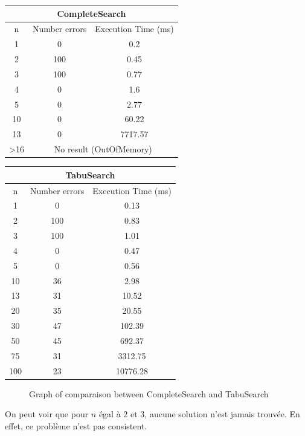 \documentclass[a4paper,10pt]{article}
\begin{document}
\noindent
\begin{tabular}{|c|c|c|}
\hline
\multicolumn{3}{|c|}{CompleteSearch}\\
\hline
n & Number errors & Execution Time (ms) \\
\hline
1 & 0 & 0.2\\
\hline
2 & 100 & 0.45\\
\hline
3 & 100 & 0.77\\
\hline
4 & 0 & 1.6\\
\hline
5 & 0 & 2.77\\
\hline
10 & 0 & 60.22\\
\hline
13 & 0 & 7717.57\\
\hline
>16 & \multicolumn{2}{c|}{No result (OutOfMemory)}\\
\hline
\end{tabular}
\begin{tabular}{|c|c|c|}
\hline
\multicolumn{3}{|c|}{TabuSearch}\\
\hline
n & Number errors & Execution Time (ms) \\
\hline
1 & 0 & 0.13\\
\hline
2 & 100 & 0.83\\
\hline
3 & 100 & 1.01\\
\hline
4 & 0 & 0.47\\
\hline
5 & 0 & 0.56\\
\hline
10 & 36 & 2.98\\
\hline
13 & 31 & 10.52\\
\hline
20 & 35 & 20.55\\
\hline
30 & 47 & 102.39\\
\hline
50 & 45 & 692.37\\
\hline
75 & 31 & 3312.75 \\
\hline
100 & 23 & 10776.28 \\
\hline
\end{tabular}

\begin{figure}[H]
    \center
     \quad
    \caption{Graph of comparaison between CompleteSearch and TabuSearch}
\end{figure}
On peut voir que pour $n$ égal à $2$ et $3$, aucune solution n'est jamais trouvée. En effet, ce problème n'est pas consistent.
\end{document}
